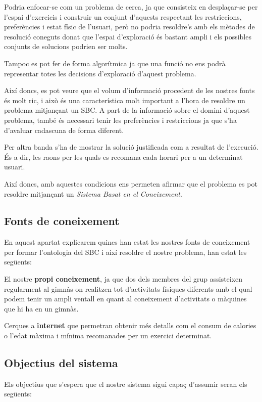 \documentclass[a4paper, 12pt, UTF8]{article}
\begin{document}
Podria enfocar-se com un problema de cerca, ja que consisteix en desplaçar-se per l'espai d'exercicis i construir un conjunt d'aquests respectant les restriccions, preferències i estat físic de l'usuari, però no podria resoldre's amb els mètodes de resolució coneguts donat que l'espai d'exploració és bastant ampli i els possibles conjunts de solucions podrien ser molts.

Tampoc es pot fer de forma algorítmica ja que una funció no ens podrà representar totes les decisions d'exploració d'aquest problema.

Així doncs, es pot veure que el volum d'informació procedent de les nostres fonts és molt ric, i això és una característica molt important a l'hora de resoldre un problema mitjançant un SBC. A part de la informació sobre el domini d'aquest problema, també és necessari tenir les preferències i restriccions ja que s'ha d'avaluar cadascuna de forma diferent.

Per altra banda s'ha de mostrar la solució justificada com a resultat de l'execució. És a dir, les raons per les quals es recomana cada horari per a un determinat usuari.

Així doncs, amb aquestes condicions ens permeten afirmar que el problema es pot resoldre mitjançant un \emph{Sistema Basat en el Coneixement}.

\subsection{Fonts de coneixement}

En aquest apartat explicarem quines han estat les nostres fonts de coneixement per formar l'ontologia del SBC i així resoldre el nostre problema, han estat les següents:

El nostre \textbf{propi coneixement}, ja que dos dels membres del grup assisteixen regularment al gimnàs on realitzen tot d'activitats físiques diferents amb el qual podem tenir un ampli ventall en quant al coneixement d'activitats o màquines que hi ha en un gimnàs.

Cerques a \textbf{internet} que permetran obtenir més detalls com el consum de calories o l'edat màxima i mínima recomanades per un exercici determinat.

\subsection{Objectius del sistema}

Els objectius que s'espera que el nostre sistema sigui capaç d'assumir seran els següents:
\end{document}
